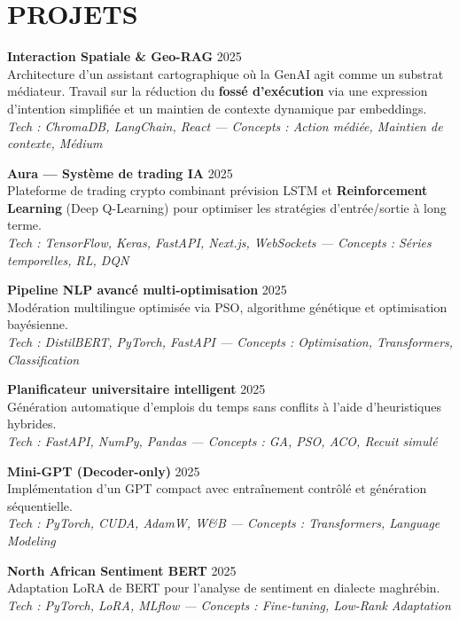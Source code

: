 \documentclass[a4paper,12pt]{article}
\begin{document}
\section{PROJETS}
\setlength{\parskip}{13pt}
{\small

\textbf{Interaction Spatiale \& Geo-RAG} \hfill 2025 \\
Architecture d'un assistant cartographique où la GenAI agit comme un substrat médiateur. Travail sur la réduction du \textbf{fossé d'exécution} via une expression d'intention simplifiée et un maintien de contexte dynamique par embeddings. \\
\textit{Tech : ChromaDB, LangChain, React — Concepts : Action médiée, Maintien de contexte, Médium}

\textbf{Aura — Système de trading IA} \hfill 2025 \\
Plateforme de trading crypto combinant prévision LSTM et \textbf{Reinforcement Learning} (Deep Q-Learning) pour optimiser les stratégies d’entrée/sortie à long terme. \\
\textit{Tech : TensorFlow, Keras, FastAPI, Next.js, WebSockets — Concepts : Séries temporelles, RL, DQN}

\textbf{Pipeline NLP avancé multi-optimisation} \hfill 2025 \\
Modération multilingue optimisée via PSO, algorithme génétique et optimisation bayésienne. \\
\textit{Tech : DistilBERT, PyTorch, FastAPI — Concepts : Optimisation, Transformers, Classification}

\textbf{Planificateur universitaire intelligent} \hfill 2025 \\
Génération automatique d’emplois du temps sans conflits à l’aide d’heuristiques hybrides. \\
\textit{Tech : FastAPI, NumPy, Pandas — Concepts : GA, PSO, ACO, Recuit simulé}

\textbf{Mini-GPT (Decoder-only)} \hfill 2025 \\
Implémentation d’un GPT compact avec entraînement contrôlé et génération séquentielle. \\
\textit{Tech : PyTorch, CUDA, AdamW, W\&B — Concepts : Transformers, Language Modeling}

\textbf{North African Sentiment BERT} \hfill 2025 \\
Adaptation LoRA de BERT pour l’analyse de sentiment en dialecte maghrébin. \\
\textit{Tech : PyTorch, LoRA, MLflow — Concepts : Fine-tuning, Low-Rank Adaptation}

}
\end{document}
